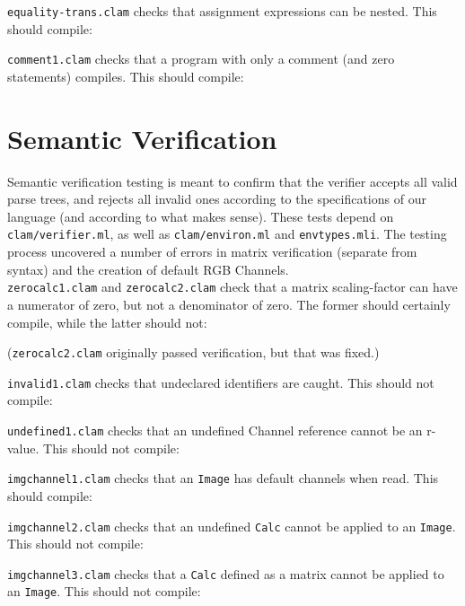 \texttt{equality-trans.clam} checks that assignment expressions can be nested. This should compile:


\texttt{comment1.clam} checks that a program with only a comment (and zero statements) compiles. This should compile:


\section{Semantic Verification}
\label{testing:semantic}

Semantic verification testing is meant to confirm that the verifier accepts all valid parse trees,
and rejects all invalid ones according to the specifications of our language
(and according to what makes sense).
These tests depend on \texttt{clam/verifier.ml}, as well as \texttt{clam/environ.ml} and \texttt{envtypes.mli}. 
The testing process uncovered a number of errors in matrix verification (separate from syntax)
and the creation of default RGB Channels.\\

\texttt{zerocalc1.clam} and \texttt{zerocalc2.clam} check that a matrix scaling-factor can
have a numerator of zero, but not a denominator of zero.
The former should certainly compile, while the latter should not:


(\texttt{zerocalc2.clam} originally passed verification, but that was fixed.)

\texttt{invalid1.clam} checks that undeclared identifiers are caught. This should not compile:


\texttt{undefined1.clam} checks that an undefined Channel reference cannot be an r-value. This should not compile:


\texttt{imgchannel1.clam} checks that an \texttt{Image} has default channels when read. This should compile:


\texttt{imgchannel2.clam} checks that an undefined \texttt{Calc} cannot be applied to an \texttt{Image}. This should not compile:


\texttt{imgchannel3.clam} checks that a \texttt{Calc} defined as a matrix cannot be applied to an \texttt{Image}. This should not compile:



